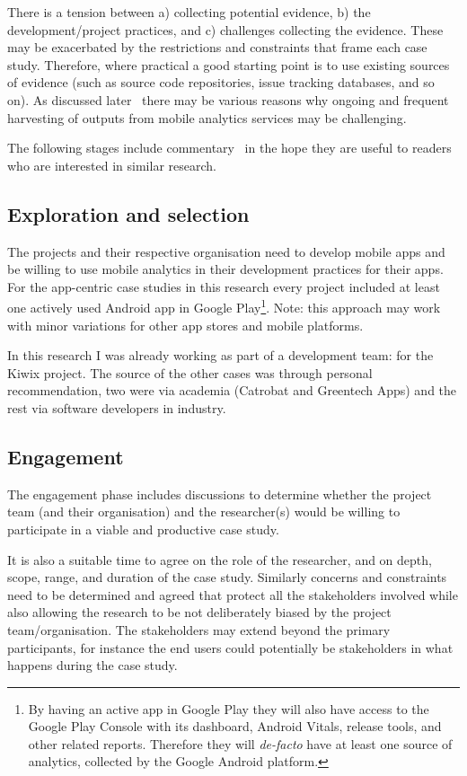 There is a tension between a) collecting potential evidence, b) the development/project practices, and c) challenges collecting the evidence. These may be exacerbated by the restrictions and constraints that frame each case study. Therefore, where practical a good starting point is to use existing sources of evidence (such as source code repositories, issue tracking databases, and so on). As discussed later~ 
there may be various reasons why ongoing and frequent harvesting of outputs from mobile analytics services may be challenging.

The following stages include commentary~ in the hope they are useful to readers who are interested in similar research.

\subsection{Exploration and selection}
The projects and their respective organisation need to develop mobile apps and be willing to use mobile analytics in their development practices for their apps. For the app-centric case studies in this research every project included at least one actively used Android app in Google Play\footnote{By having an active app in Google Play they will also have access to the Google Play Console with its dashboard, Android Vitals, release tools, and other related reports. Therefore they will \emph{de-facto} have at least one source of analytics, collected by the Google Android platform.}. Note: this approach may work with minor variations for other app stores and mobile platforms.

In this research I was already working as part of a development team: for the Kiwix project. The source of the other cases was through personal recommendation, two were via academia (Catrobat and Greentech Apps) and the rest via software developers in industry.

\subsection{Engagement}
The engagement phase includes discussions to determine whether the project team (and their organisation) and the researcher(s) would be willing to participate in a viable and productive case study. 

It is also a suitable time to agree on the role of the researcher, and on depth, scope, range, and duration of the case study. Similarly concerns and constraints need to be determined and agreed that protect all the stakeholders involved while also allowing the research to be not deliberately biased by the project team/organisation. The stakeholders may extend beyond the primary participants, for instance the end users could potentially be stakeholders in what happens during the case study.

